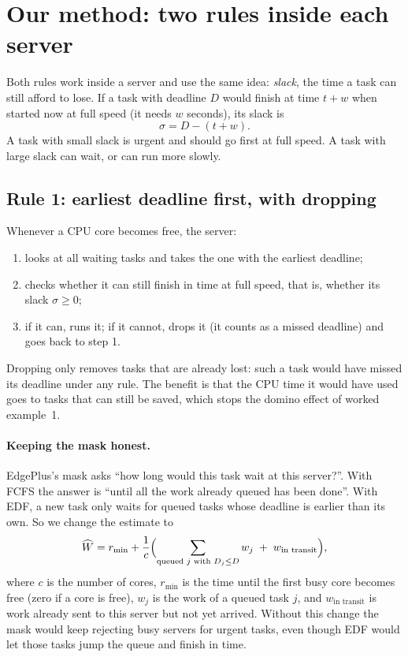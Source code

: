 \documentclass[11pt]{article}
\theoremstyle{definition}
\begin{document}
\section{Our method: two rules inside each server}
\label{sec:method}

Both rules work inside a server and use the same idea: \emph{slack}, the time a task can still afford to lose.
If a task with deadline $D$ would finish at time $t + w$ when started now at full speed (it needs $w$ seconds),
its slack is
\begin{equation}
\sigma = D - (t + w).
\label{eq:slack}
\end{equation}
A task with small slack is urgent and should go first at full speed. A task with large slack can wait, or can
run more slowly.

\subsection{Rule 1: earliest deadline first, with dropping}
\label{sec:rule1}
Whenever a CPU core becomes free, the server:
\begin{enumerate}
\item looks at all waiting tasks and takes the one with the earliest deadline;
\item checks whether it can still finish in time at full speed, that is, whether its slack $\sigma \ge 0$;
\item if it can, runs it; if it cannot, drops it (it counts as a missed deadline) and goes back to step 1.
\end{enumerate}
Dropping only removes tasks that are already lost: such a task would have missed its deadline under any rule. The
benefit is that the CPU time it would have used goes to tasks that can still be saved, which stops the domino
effect of worked example~1.

\paragraph{Keeping the mask honest.} EdgePlus's mask asks ``how long would this task wait at this server?''.
With FCFS the answer is ``until all the work already queued has been done''. With EDF, a new task only waits for
queued tasks whose deadline is earlier than its own. So we change the estimate to
\begin{equation}
\widehat{W} = r_{\min} + \frac{1}{c}\Bigl(\sum_{\text{queued } j \text{ with } D_j \le D} w_j \; + \; w_{\text{in transit}}\Bigr),
\label{eq:wait}
\end{equation}
where $c$ is the number of cores, $r_{\min}$ is the time until the first busy core becomes free (zero if a core is
free), $w_j$ is the work of a queued task $j$, and $w_{\text{in transit}}$ is work already sent to this server
but not yet arrived. Without this change the mask would keep rejecting busy servers for urgent tasks, even though
EDF would let those tasks jump the queue and finish in time.
\end{document}

